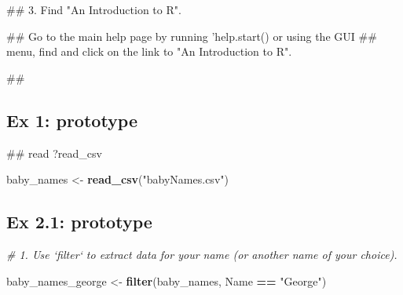 \documentclass[]{book}
\newenvironment{Shaded}{\begin{snugshade}}{\end{snugshade}}
\newcommand{\KeywordTok}[1]{\textcolor[rgb]{0.13,0.29,0.53}{\textbf{#1}}}
\newcommand{\StringTok}[1]{\textcolor[rgb]{0.31,0.60,0.02}{#1}}
\newcommand{\CommentTok}[1]{\textcolor[rgb]{0.56,0.35,0.01}{\textit{#1}}}
\newcommand{\OperatorTok}[1]{\textcolor[rgb]{0.81,0.36,0.00}{\textbf{#1}}}
\newcommand{\NormalTok}[1]{#1}
\begin{document}
\begin{Shaded}
\begin{Highlighting}[]
\NormalTok{## 3. Find "An Introduction to R".}
\end{Highlighting}
\end{Shaded}

\begin{Shaded}
\begin{Highlighting}[]
\NormalTok{## Go to the main help page by running 'help.start() or using the GUI}
\NormalTok{## menu, find and click on the link to "An Introduction to R".}
\end{Highlighting}
\end{Shaded}

\begin{Shaded}
\begin{Highlighting}[]
\NormalTok{##}
\end{Highlighting}
\end{Shaded}

\subsection{Ex 1: prototype}\label{ex-1-prototype}

\begin{Shaded}
\begin{Highlighting}[]
\NormalTok{## read ?read_csv}
\end{Highlighting}
\end{Shaded}

\begin{Shaded}
\begin{Highlighting}[]
\NormalTok{baby_names <-}\StringTok{ }\KeywordTok{read_csv}\NormalTok{(}\StringTok{"babyNames.csv"}\NormalTok{)}
\end{Highlighting}
\end{Shaded}

\subsection{Ex 2.1: prototype}\label{ex-2.1-prototype}

\begin{Shaded}
\begin{Highlighting}[]
\CommentTok{# 1.  Use `filter` to extract data for your name (or another name of your choice).  }
\end{Highlighting}
\end{Shaded}

\begin{Shaded}
\begin{Highlighting}[]
\NormalTok{baby_names_george <-}\StringTok{ }\KeywordTok{filter}\NormalTok{(baby_names, Name }\OperatorTok{==}\StringTok{ "George"}\NormalTok{)}
\end{Highlighting}
\end{Shaded}
\end{document}
